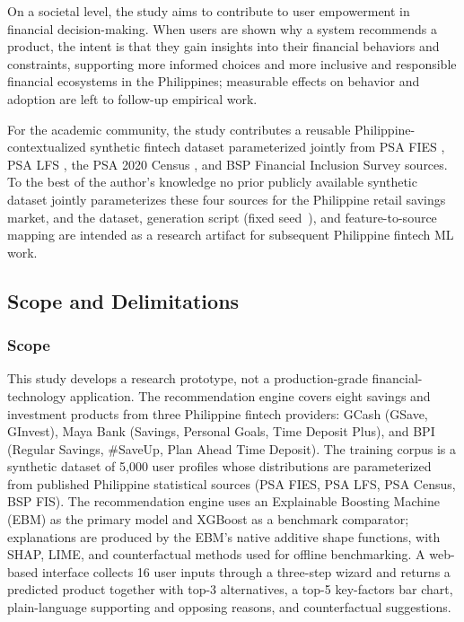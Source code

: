 \documentclass{icsthesis}
\begin{document}
\begin{mainmatter}
                On a societal level, the study aims to contribute to user empowerment in financial decision-making. When users are shown why a system recommends a product, the intent is that they gain insights into their financial behaviors and constraints, supporting more informed choices and more inclusive and responsible financial ecosystems in the Philippines; measurable effects on behavior and adoption are left to follow-up empirical work.

                For the academic community, the study contributes a reusable Philippine-contextualized synthetic fintech dataset parameterized jointly from PSA FIES \cite{ref40}, PSA LFS \cite{ref41}, the PSA 2020 Census \cite{ref39}, and BSP Financial Inclusion Survey \cite{ref35} sources. To the best of the author's knowledge no prior publicly available synthetic dataset jointly parameterizes these four sources for the Philippine retail savings market, and the dataset, generation script (fixed seed~\cite{ref60}), and feature-to-source mapping are intended as a research artifact for subsequent Philippine fintech ML work.
                
            \subsection{Scope and Delimitations}
				\subsubsection{Scope}
                    This study develops a research prototype, not a production-grade financial-technology application. The recommendation engine covers eight savings and investment products from three Philippine fintech providers: GCash (GSave, GInvest), Maya Bank (Savings, Personal Goals, Time Deposit Plus), and BPI (Regular Savings, \#SaveUp, Plan Ahead Time Deposit). The training corpus is a synthetic dataset of 5{,}000 user profiles whose distributions are parameterized from published Philippine statistical sources (PSA FIES, PSA LFS, PSA Census, BSP FIS). The recommendation engine uses an Explainable Boosting Machine (EBM) as the primary model and XGBoost as a benchmark comparator; explanations are produced by the EBM's native additive shape functions, with SHAP, LIME, and counterfactual methods used for offline benchmarking. A web-based interface collects 16 user inputs through a three-step wizard and returns a predicted product together with top-3 alternatives, a top-5 key-factors bar chart, plain-language supporting and opposing reasons, and counterfactual suggestions.


\end{mainmatter}
\end{document}
